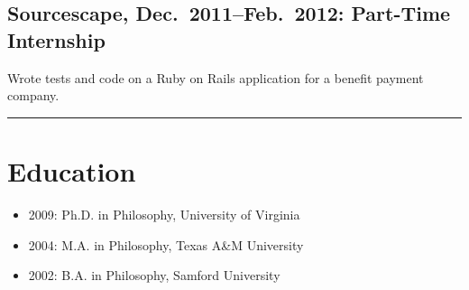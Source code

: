 \documentclass{article}
\begin{document}
  \subsection{Sourcescape, Dec.\ 2011--Feb.\ 2012: Part-Time 
  Internship} %
  \label{sub:Sourcescape}


  {\indent} Wrote tests and code on a Ruby on Rails application for a benefit 
  payment company.
  

\hrule
\section{Education} %
\label{sec:Education}

\begin{itemize}
  \item 2009: Ph.D. in Philosophy, University of Virginia
  \item 2004: M.A. in Philosophy, Texas A\&M University
  \item 2002: B.A. in Philosophy, Samford University
\end{itemize}
\end{document}
